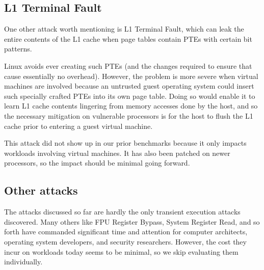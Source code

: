 \subsection{L1 Terminal Fault}
One other attack worth mentioning is L1 Terminal Fault, which can leak the entire contents of the L1 cache when page tables contain PTEs with certain bit patterns.

Linux avoids ever creating such PTEs (and the changes required to ensure that cause essentially no overhead).
However, the problem is more severe when virtual machines are involved because an untrusted guest operating system could insert such specially crafted PTEs into its own page table.
Doing so would enable it to learn L1 cache contents lingering from memory accesses done by the host, and so the necessary mitigation on vulnerable processors is for the host to flush the L1 cache prior to entering a guest virtual machine.

This attack did not show up in our prior benchmarks because it only impacts workloads involving virtual machines.
It has also been patched on newer processors, so the impact should be minimal going forward.

\subsection{Other attacks}

The attacks discussed so far are hardly the only transient execution attacks discovered.
Many others like FPU Register Bypass, System Register Read, and so forth have commanded significant time and attention for computer architects, operating system developers, and security researchers.
However, the cost they incur on workloads today seems to be minimal, so we skip evaluating them individually.
